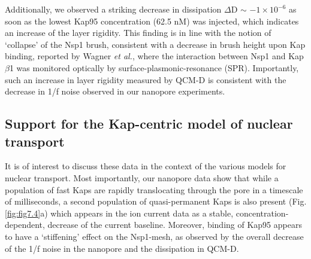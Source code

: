 Additionally, we observed a striking decrease in dissipation $\Delta$D $\sim$ $-1\times10^{-6}$ as soon as the lowest Kap95 concentration (62.5 nM) was injected, which indicates an increase of the layer rigidity\cite{Eisele2010a,Reviakine2011,Eisele2013}. This finding is in line with the notion of ‘collapse’ of the Nsp1 brush, consistent with a decrease in brush height upon Kap binding, reported by Wagner \emph{et al.}\cite{Wagner2015}, where the interaction between Nsp1 and Kap$\beta$1 was monitored optically by surface-plasmonic-resonance (SPR). Importantly, such an increase in layer rigidity measured by QCM-D is consistent with the decrease in 1/f noise observed in our nanopore experiments.


\subsection{Support for the Kap-centric model of nuclear transport}
It is of interest to discuss these data in the context of the various models for nuclear transport. Most importantly, our nanopore data show that while a population of fast Kaps are rapidly translocating through the pore in a timescale of milliseconds, a second population of quasi-permanent Kaps is also present (Fig.\ref{fig:fig7.4}a) which appears in the ion current data as a stable, concentration-dependent, decrease of the current baseline. Moreover, binding of Kap95 appears to have a ‘stiffening’ effect on the Nsp1-mesh, as observed by the overall decrease of the 1/f noise in the nanopore and the dissipation in QCM-D.

